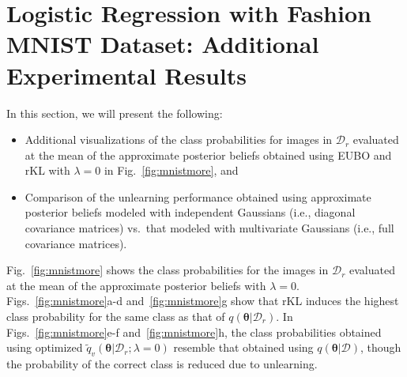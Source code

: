 \documentclass{article}
\theoremstyle{definition}
\newcommand{\mcl}[1]{\mathcal{#1}}
\newcommand{\da}{\mcl{D}}
\newcommand{\dc}{\mcl{D}_r}
\newcommand{\elbo}{\tilde{q}_v}
\begin{document}
\section{Logistic Regression with Fashion MNIST Dataset: Additional Experimental Results
}
\label{app:fashionmnist}
%
In this section, we will present the following:
\begin{itemize}
    \item Additional visualizations of the class probabilities for images in $\dc$ evaluated at the mean of the approximate posterior beliefs obtained using EUBO and rKL with $\lambda = 0$ in Fig.~\ref{fig:mnistmore}, and
    \item Comparison of the unlearning performance obtained using approximate posterior beliefs modeled with independent Gaussians (i.e., diagonal covariance matrices) vs.~that modeled with multivariate Gaussians (i.e., full covariance matrices).
\end{itemize}
%
Fig.~\ref{fig:mnistmore} shows the class probabilities for the images in $\dc$ evaluated at the mean of the approximate posterior beliefs with $\lambda = 0$. 
Figs.~\ref{fig:mnistmore}a-d and~\ref{fig:mnistmore}g show that rKL induces the highest class probability for the same class as that of
$q(\bm{\theta}|\dc)$.
In Figs.~\ref{fig:mnistmore}e-f and~\ref{fig:mnistmore}h, the class probabilities obtained using optimized $\elbo(\bm{\theta}|\dc;\lambda=0)$ resemble that obtained using $q(\bm{\theta}|\da)$, though the probability of the correct class is reduced due to unlearning.
\end{document}
